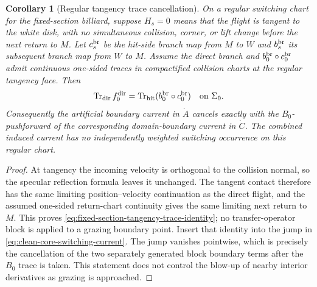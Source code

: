 \documentclass[11pt]{article}
\newtheorem{corollary}[theorem]{Corollary}
\begin{document}
\begin{corollary}[Regular tangency trace cancellation]
\label{cor:fixed-section-tangency-trace-cancellation}
On a regular switching chart for the fixed-section billiard, suppose
$H_s=0$ means that the flight is tangent to the white disk, with no
simultaneous collision, corner, or lift change before the next return to
$M$.  Let $c_s^{\rm br}$ be the hit-side branch map from $M$ to $W$ and
$b_s^{\rm br}$ its subsequent branch map from $W$ to $M$.  Assume the direct
branch and $b_0^{\rm br}\circ c_0^{\rm br}$ admit continuous one-sided traces
in compactified collision charts at the regular tangency face.  Then
\begin{equation}
\label{eq:fixed-section-tangency-trace-identity}
 \operatorname{Tr}_{\rm dir}f_0^{\rm dir}
 =\operatorname{Tr}_{\rm hit}
   (b_0^{\rm br}\circ c_0^{\rm br})
 \quad\hbox{on }\Sigma_0.
\end{equation}
Consequently the artificial boundary current in $\dot A$ cancels exactly
with the $B_0$-pushforward of the corresponding domain-boundary current in
$\dot C$.  The combined induced current has no independently weighted
switching occurrence on this regular chart.
\end{corollary}

\begin{proof}
At tangency the incoming velocity is orthogonal to the collision normal, so
the specular reflection formula leaves it unchanged.  The tangent contact
therefore has the same limiting position--velocity continuation as the
direct flight, and the assumed one-sided return-chart continuity gives the
same limiting next return to $M$.  This proves
\eqref{eq:fixed-section-tangency-trace-identity}; no transfer-operator block
is applied to a grazing boundary point.  Insert that identity into the jump in
\eqref{eq:clean-core-switching-current}.  The jump vanishes pointwise, which
is precisely the cancellation of the two separately generated block
boundary terms after the $B_0$ trace is taken.  This statement does not
control the blow-up of nearby interior derivatives as grazing is approached.
\end{proof}
\end{document}
